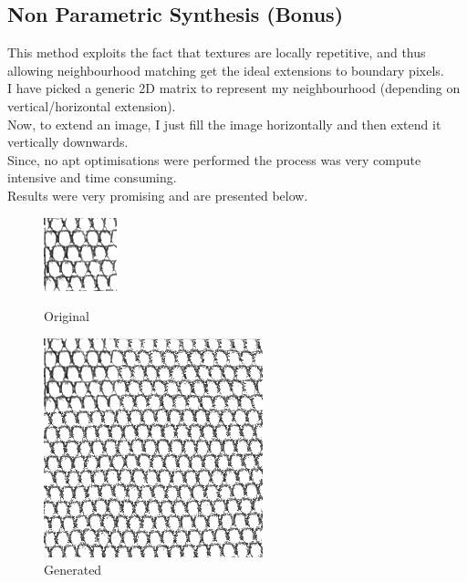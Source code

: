\documentclass{article}
\begin{document}
    \subsection*{Non Parametric Synthesis (Bonus)}
    This method exploits the fact that textures are locally repetitive, and thus allowing neighbourhood matching get the ideal extensions to boundary pixels.\\
    I have picked a generic 2D matrix to represent my neighbourhood (depending on vertical/horizontal extension).\\
    Now, to extend an image, I just fill the image horizontally and then extend it vertically downwards.\\
    Since, no apt optimisations were performed the process was very compute intensive and time consuming.\\
    Results were very promising and are presented below.\\

    \begin{figure}[!htb]
    \begin{center}
      \includegraphics[scale=.6]{5/report/non_parametric/1.png}
      \caption{Original}
    \end{center}
    \endminipage
    \begin{center}
      \includegraphics[scale=1.0]{5/report/non_parametric/1_created.png}
      \caption{Generated}
    \end{center}
    \endminipage
    \end{figure} 
\end{document}
